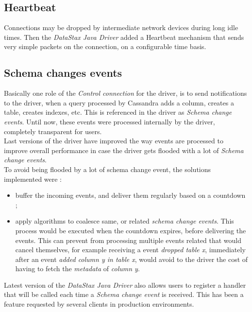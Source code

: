 \documentclass[a4paper]{report}
\newcommand{\djd}{\emph{DataStax Java Driver\xspace}}
\begin{document}
\subsection{Heartbeat}
Connections may be dropped by intermediate network devices during long idle times. Then the \djd{} added a Heartbeat mechanism that sends very simple packets on the connection, on a configurable time basis.

\subsection{Schema changes events}
Basically one role of the \emph{Control connection} for the driver, is to send notifications to the driver, when a query processed by Cassandra adds a column, creates a table, creates indexes, etc. This is referenced in the driver as \emph{Schema change events}. Until now, these events were processed internally by the driver, completely transparent for users.\\
Last versions of the driver have improved the way events are processed to improve overall performance in case the driver gets flooded with a lot of \emph{Schema change events}.\\
To avoid being flooded by a lot of schema change event, the solutions implemented were : 
\begin{itemize}
   \item buffer the incoming events, and deliver them regularly based on a countdown ;
   \item apply algorithms to coalesce same, or related \emph{schema change events}. This process would be executed when the countdown expires, before delivering the events. This can prevent from processing multiple events related that would cancel themselves, for example receiving a event \emph{dropped table x}, immediately after an event \emph{added column y in table x}, would avoid to the driver the cost of having to fetch the \emph{metadata} of \emph{column y}.
\end{itemize}
Latest version of the \djd{} also allows users to register a handler that will be called each time a \emph{Schema change event} is received. This has been a feature requested by several clients in production environments.
\end{document}
